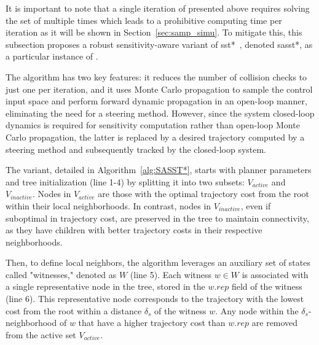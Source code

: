 It is important to note that a single iteration of  presented above requires solving the set of  multiple times which leads to a prohibitive computing time per iteration as it will be shown in Section~\ref{sec:samp_simu}.
To mitigate this, this subsection proposes a robust sensitivity-aware variant of \gls{sst*}~\cite{cSST}, denoted \gls{sasst*}, as a particular instance of . 

The  algorithm has two key features: it reduces the number of collision checks to just one per iteration, and it uses Monte Carlo propagation to sample the control input space and perform forward dynamic propagation in an open-loop manner, eliminating the need for a steering method.
However, since the system closed-loop dynamics is required for sensitivity computation rather than open-loop Monte Carlo propagation, the latter is replaced by a desired trajectory computed by a steering method and subsequently tracked by the closed-loop system.

The  variant, detailed in Algorithm~\ref{alg:SASST*}, starts with planner parameters and tree initialization (line 1-4) by splitting it into two subsets: $V_{active}$ and $V_{inactive}.$
Nodes in $V_{active}$ are those with the optimal trajectory cost from the root within their local neighborhoods. 
In contrast, nodes in $V_{inactive}$, even if suboptimal in trajectory cost, are preserved in the tree to maintain connectivity, as they have children with better trajectory costs in their respective neighborhoods. 

Then, to define local neighbors, the algorithm leverages an auxiliary set of states called "witnesses," denoted as $W$ (line 5). 
Each witness $w \in W$ is associated with a single representative node in the tree, stored in the $w.rep$ field of the witness (line 6).
This representative node corresponds to the trajectory with the lowest cost from the root within a distance $\delta_s$ of the witness $w$.
Any node within the $\delta_s$-neighborhood of $w$ that have a higher trajectory cost than $w.rep$ are removed from the active set $V_{active}$.

